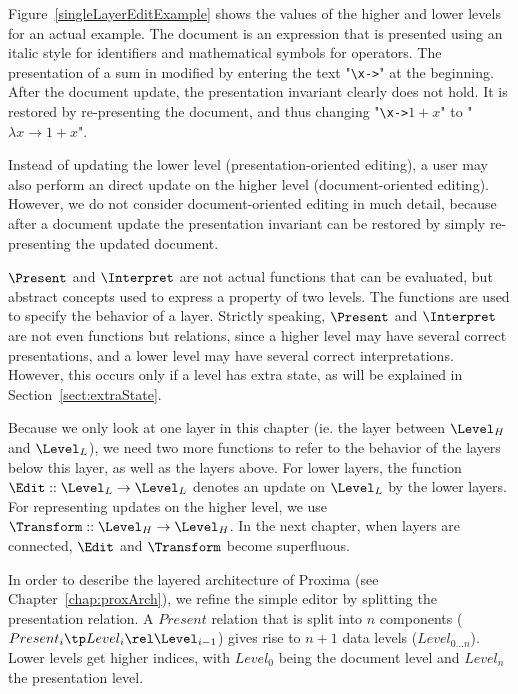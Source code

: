 Figure~\ref{singleLayerEditExample} shows the values of the higher and lower levels for an actual example. The document is an expression that is presented using an italic style for identifiers and mathematical symbols for operators. The presentation of a sum in modified by entering the text "\verb|\x->|" at the beginning. After the document update, the presentation invariant clearly does not hold. It is restored by re-presenting the document, and thus changing "\verb|\x->|$1+x$" to "$\lambda x \to 1+x$".


Instead of updating the lower level (presentation-oriented editing), a user may also perform an direct update on the higher level (document-oriented editing). However, we do not consider document-oriented editing in much detail, because after a document update the presentation invariant can be restored by simply re-presenting the updated document.


\bc
$\Present$ and $\Interpret$ are not actual functions that can be evaluated, but abstract concepts used to express a property of two levels. The functions are used to specify the behavior of a layer.
Strictly speaking, $\Present$ and $\Interpret$ are not even functions but relations, since a higher level may have several correct presentations, and a lower level may have several correct interpretations. However, this occurs only if a level has extra state, as will be explained in Section~\ref{sect:extraState}. \ec

\bc Because we only look at one layer in this chapter (ie. the layer between $\Level_{H}$ and $\Level_{L}$), we need two more functions to refer to the behavior of the layers below this layer, as well as the layers above. For lower layers, the function 
$\Edit :: \Level_{L} \rightarrow \Level_{L}$ denotes an update on $\Level_{L}$ by the lower layers. For representing updates on the higher level, we use 
$\Transform :: \Level_{H} \rightarrow \Level_{H}$. In the next chapter, when layers are connected, $\Edit$ and $\Transform$ become superfluous.\ec



In order to describe the layered architecture of Proxima (see Chapter~\ref{chap:proxArch}), we refine the simple editor by splitting the presentation relation. A $Present$ relation that is split into $n$ components 
($Present_{i} \tp Level_{i} \rel \Level_{i-1}$) gives rise to $n+1$ data levels ($Level_{0 \dots n}$). Lower levels get higher indices, with $Level_{0}$ being the document level and $Level_{n}$ the presentation level. 

